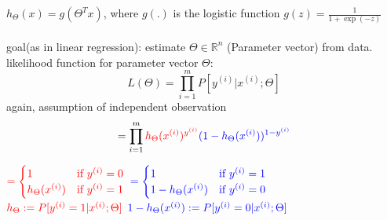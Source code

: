 $h_{\Theta}(x) = g(\Theta^T x)$, where $g(.)$ is the logistic function $g(z) = \frac{1}{1+\exp(-z)}$\\\\
goal(as in linear regression): estimate $\Theta \in \mathbb{R}^n$ (Parameter vector) from data.\\
likelihood function for parameter vector $\Theta$:
\[L(\Theta) = \prod^m_{i=1} P[y^{(i)}|x^{(i)} ; \Theta]\]
again, assumption of independent observation
\[= \prod^m_{i=1} \textcolor{red}{h_{\Theta}(x^{(i)})^{y^{(i)}}} \textcolor{blue}{(1-h_{\Theta}(x^{(i)}))^{1-y^{(i)}}}\]
\begin{center}

$\textcolor{red}{=\begin{cases}1&\text{if $y^{(i)} = 0$}\\h_{\Theta}(x^{(i)})&\text{if $y^{(i)} = 1$}\end{cases}}$
$\textcolor{blue}{=\begin{cases}1&\text{if $y^{(i)} = 1$}\\1-h_{\Theta}(x^{(i)})&\text{if $y^{(i)} = 0$}\end{cases}}$\\
$\textcolor{red}{h_{\Theta} := P[y^{(i)} = 1 | x^{(i)};\Theta]}$\space\space
$\textcolor{blue}{1-h_{\Theta}(x^{(i)}) := P[y^{(i)} = 0 | x^{(i)};\Theta]}$
\end{center}

